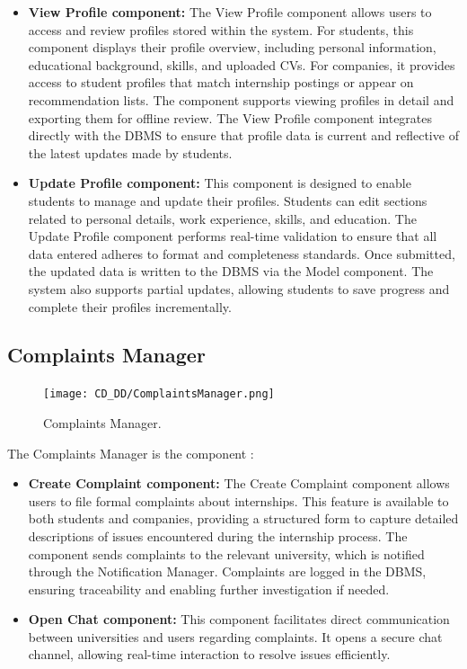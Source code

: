 \begin{itemize}
    \item \textbf{View Profile component:} The View Profile component allows users to access and review profiles stored within the system. For students, this component displays their profile overview, including personal information, educational background, skills, and uploaded CVs. For companies, it provides access to student profiles that match internship postings or appear on recommendation lists. The component supports viewing profiles in detail and exporting them for offline review. The View Profile component integrates directly with the DBMS to ensure that profile data is current and reflective of the latest updates made by students.
    \item \textbf{Update Profile component:} This component is designed to enable students to manage and update their profiles. Students can edit sections related to personal details, work experience, skills, and education. The Update Profile component performs real-time validation to ensure that all data entered adheres to format and completeness standards. Once submitted, the updated data is written to the DBMS via the Model component. The system also supports partial updates, allowing students to save progress and complete their profiles incrementally.
\end{itemize}

\subsection{Complaints Manager}
\label{subsec:complaints_manager}%

\begin{figure}[H]
    \begin{center}
        \texttt{[image: CD\_DD/ComplaintsManager.png]}
        \caption{Complaints Manager.}
        \label{fig:complaints_manager}%
    \end{center}
\end{figure}

\noindent The Complaints Manager is the component :

\begin{itemize}
    \item \textbf{Create Complaint component:} The Create Complaint component allows users to file formal complaints about internships. This feature is available to both students and companies, providing a structured form to capture detailed descriptions of issues encountered during the internship process. The component sends complaints to the relevant university, which is notified through the Notification Manager. Complaints are logged in the DBMS, ensuring traceability and enabling further investigation if needed.
    \item \textbf{Open Chat component:} This component facilitates direct communication between universities and users regarding complaints. It opens a secure chat channel, allowing real-time interaction to resolve issues efficiently.
\end{itemize}


